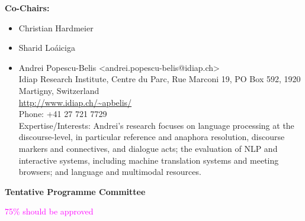 \documentclass[11pt]{article}
\begin{document}
\medskip

\textbf{Co-Chairs:}
\begin{itemize}

\item Christian Hardmeier



\item Sharid Loáiciga

\item  Andrei Popescu-Belis <andrei.popescu-belis@idiap.ch>\\
Idiap Research Institute, Centre du Parc, Rue Marconi 19, PO Box 592,
1920 Martigny, Switzerland\\
\url{http://www.idiap.ch/~apbelis/}\\
Phone: +41 27 721 7729\\
Expertise/Interests: Andrei's research focuses on language processing at the discourse-level, 
in particular reference and anaphora resolution, discourse markers and
connectives, and dialogue acts; the evaluation of NLP and interactive
systems, including machine translation systems and meeting browsers;
and language and multimodal resources.


\end{itemize}

\medskip

\textbf{Tentative Programme Committee}

\textcolor{magenta}{75\% should be approved}
\end{document}
